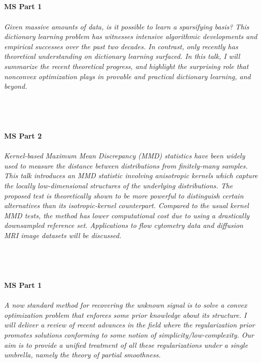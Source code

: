 \begin{multicols}{2}
\\ 
    \\
    \\\\
    \noindent\textbf{MS Part 1}\\
\\  
    \textit{Given massive amounts of data, is it possible to learn a sparsifying basis? This dictionary learning problem has witnesses intensive algorithmic developments and empirical successes over the past two decades. In contrast, only recently has theoretical understanding on dictionary learning surfaced. In this talk, I will summarize the recent theoretical progress, and highlight the surprising role that nonconvex optimization plays in provable and practical dictionary learning, and beyond. }\\
\\ 
    \\
    \\\\
    \noindent\textbf{MS Part 2}\\
\\  
    \textit{Kernel-based Maximum Mean Discrepancy (MMD) statistics have been widely used to measure the distance between distributions from finitely-many samples. This talk introduces an MMD statistic involving anisotropic kernels which capture the locally low-dimensional structures of the underlying distributions. The proposed test is theoretically shown to be more powerful to distinguish certain alternatives than its isotropic-kernel counterpart. Compared to the usual kernel MMD tests, the method has lower computational cost due to using a drastically downsampled reference set. Applications to flow cytometry data and diffusion MRI image datasets will be discussed.}\\
\\ 
    \\
    \\\\
    \noindent\textbf{MS Part 1}\\
\\  
    \textit{A now standard method for recovering the unknown signal is to solve a convex optimization problem that enforces some prior knowledge about its structure. I will deliver a review of recent advances in the field where the regularization prior promotes solutions conforming to some notion of simplicity/low-complexity. Our aim is to provide a unified treatment of all these regularizations under a single umbrella, namely the theory of partial smoothness.}\\

\end{multicols}
